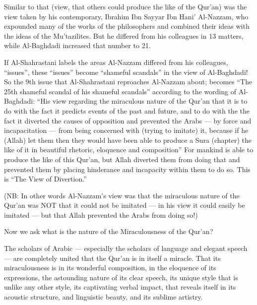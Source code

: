 \documentclass[12pt]{book}
\begin{document}

Similar to that (view, that others could produce the like of the Qur’an) was
the view taken by his contemporary, Ibrahim Ibn Sayyar Ibn Hani’ Al-Nazzam, who
expounded many of the works of the philosophers and combined their ideas with
the ideas of the Mu’tazilites\footnotemark.
But he differed from his colleagues in 13
matters, while Al-Baghdadi increased that number to 21.


If Al-Shahrastani labels the areas Al-Nazzam differed from his colleagues,
“issues”, these “issues” become “shameful scandals” in the view of Al-Baghdadi!
So the 9th issue that Al-Shahrastani reproaches Al-Nazzam about; becomes “The
25th shameful scandal of his shameful scandals” according to the wording of
Al-Baghdadi: “His view regarding the miraculous nature of the Qur’an that it is
to do with the fact it predicts events of the past and future, and to do with
the the fact it diverted the causes of opposition and prevented the Arabs — by
force and incapacitation — from being concerned with (trying to imitate) it,
because if he (Allah) let them then they would have been able to produce a Sura
(chapter) the like of it in beautiful rhetoric, eloquence and composition” For
mankind is able to produce the like of this Qur’an, but Allah diverted them
from doing that and prevented them by placing hinderance and incapacity within
them to do so. This is “The View of Divertion.”\footnotemark

(NB: In other words Al-Nazzam’s view was that the miraculous nature of the
Qur’an was NOT that it could not be imitated — in his view it could easily be
imitated — but that Allah prevented the Arabs from doing so!)


Now we ask what is the nature of the Miraculousness of the Qur’an?

The scholars of Arabic — especially the scholars of language and elegant speech
— are completely united that the Qur’an is in itself a miracle. That its
miraculousness is in its wonderful composition, in the eloquence of its
expressions, the astounding nature of its clear speech, its unique style that
is unlike any other style, its captivating verbal impact, that reveals itself
in its acoustic structure, and linguistic beauty, and its sublime artistry.
\end{document}
